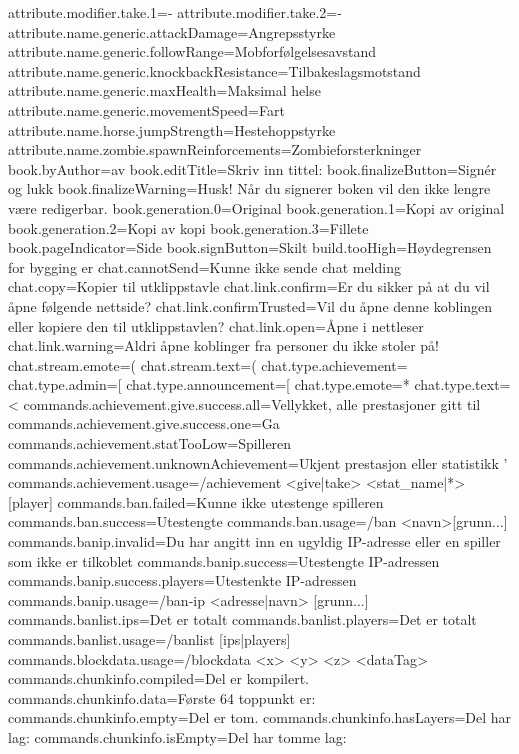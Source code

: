attribute.modifier.take.1=-%
attribute.modifier.take.2=-%
attribute.name.generic.attackDamage=Angrepsstyrke
attribute.name.generic.followRange=Mobforfølgelsesavstand
attribute.name.generic.knockbackResistance=Tilbakeslagsmotstand
attribute.name.generic.maxHealth=Maksimal helse
attribute.name.generic.movementSpeed=Fart
attribute.name.horse.jumpStrength=Hestehoppstyrke
attribute.name.zombie.spawnReinforcements=Zombieforsterkninger
book.byAuthor=av %
book.editTitle=Skriv inn tittel:
book.finalizeButton=Signér og lukk
book.finalizeWarning=Husk! Når du signerer boken vil den ikke lengre være redigerbar.
book.generation.0=Original
book.generation.1=Kopi av original
book.generation.2=Kopi av kopi
book.generation.3=Fillete
book.pageIndicator=Side %
book.signButton=Skilt
build.tooHigh=Høydegrensen for bygging er %
chat.cannotSend=Kunne ikke sende chat melding
chat.copy=Kopier til utklippstavle
chat.link.confirm=Er du sikker på at du vil åpne følgende nettside?
chat.link.confirmTrusted=Vil du åpne denne koblingen eller kopiere den til utklippstavlen?
chat.link.open=Åpne i nettleser
chat.link.warning=Aldri åpne koblinger fra personer du ikke stoler på!
chat.stream.emote=(%
chat.stream.text=(%
chat.type.achievement=%
chat.type.admin=[%
chat.type.announcement=[%
chat.type.emote=* %
chat.type.text=<%
commands.achievement.give.success.all=Vellykket, alle prestasjoner gitt til %
commands.achievement.give.success.one=Ga %
commands.achievement.statTooLow=Spilleren %
commands.achievement.unknownAchievement=Ukjent prestasjon eller statistikk '%
commands.achievement.usage=/achievement <give|take> <stat_name|*> [player]
commands.ban.failed=Kunne ikke utestenge spilleren %
commands.ban.success=Utestengte %
commands.ban.usage=/ban <navn>[grunn...]
commands.banip.invalid=Du har angitt inn en ugyldig IP-adresse eller en spiller som ikke er tilkoblet
commands.banip.success=Utestengte IP-adressen %
commands.banip.success.players=Utestenkte IP-adressen %
commands.banip.usage=/ban-ip <adresse|navn> [grunn...]
commands.banlist.ips=Det er totalt %
commands.banlist.players=Det er totalt %
commands.banlist.usage=/banlist [ips|players]
commands.blockdata.usage=/blockdata <x> <y> <z> <dataTag>
commands.chunkinfo.compiled=Del er kompilert.
commands.chunkinfo.data=Første 64 toppunkt er: %
commands.chunkinfo.empty=Del er tom.
commands.chunkinfo.hasLayers=Del har lag: %
commands.chunkinfo.isEmpty=Del har tomme lag: %
